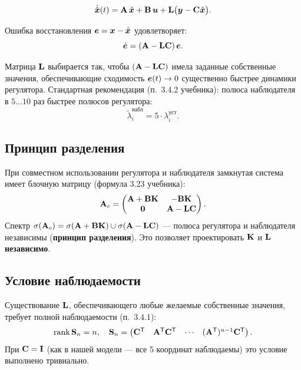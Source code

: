 \begin{formulabox}[title={Уравнение наблюдателя (Luenberger)}]
\begin{equation}
  \dot{\hat{\bm{x}}}(t) = \mathbf{A}\,\hat{\bm{x}} + \mathbf{B}\,\bm{u}
       + \mathbf{L}\big(\bm{y} - \mathbf{C}\hat{\bm{x}}\big).
  \label{eq:observer}
\end{equation}
\end{formulabox}

Ошибка восстановления $\bm{e} = \bm{x} - \hat{\bm{x}}$ удовлетворяет:
\begin{equation}
  \dot{\bm{e}} = (\mathbf{A} - \mathbf{L}\mathbf{C})\,\bm{e}.
  \label{eq:observer_error}
\end{equation}

Матрица $\mathbf{L}$ выбирается так, чтобы $(\mathbf{A}-\mathbf{L}\mathbf{C})$
имела заданные собственные значения, обеспечивающие сходимость
$\bm{e}(t) \to 0$ существенно быстрее динамики регулятора.
Стандартная рекомендация (п.~3.4.2 учебника): полюса наблюдателя в $5\ldots10$ раз
быстрее полюсов регулятора:
\begin{equation}
  \tilde{\lambda}^{\text{набл}}_i = 5 \cdot \lambda^{\text{уст}}_i.
  \label{eq:observer_eigvals}
\end{equation}

\subsection{Принцип разделения}

При совместном использовании регулятора и наблюдателя замкнутая
система имеет блочную матрицу (формула 3.23 учебника):
\begin{equation}
  \mathbf{A}_c = \begin{pmatrix}
    \mathbf{A}+\mathbf{B}\mathbf{K} & -\mathbf{B}\mathbf{K}\\
    \mathbf{0} & \mathbf{A}-\mathbf{L}\mathbf{C}
  \end{pmatrix}.
  \label{eq:separation}
\end{equation}
Спектр $\sigma(\mathbf{A}_c) = \sigma(\mathbf{A}+\mathbf{B}\mathbf{K}) \cup \sigma(\mathbf{A}-\mathbf{L}\mathbf{C})$ ---
полюса регулятора и наблюдателя независимы (\textbf{принцип разделения}).
Это позволяет проектировать $\mathbf{K}$ и $\mathbf{L}$ \textbf{независимо}.

\subsection{Условие наблюдаемости}

Существование $\mathbf{L}$, обеспечивающего любые желаемые собственные
значения, требует полной наблюдаемости (п.~3.4.1):
\begin{equation}
  \operatorname{rank}\mathbf{S}_n = n,
  \quad
  \mathbf{S}_n = \begin{pmatrix} \mathbf{C}^{\mathsf{T}} & \mathbf{A}^{\mathsf{T}}\mathbf{C}^{\mathsf{T}} & \cdots & (\mathbf{A}^{\mathsf{T}})^{n-1}\mathbf{C}^{\mathsf{T}} \end{pmatrix}.
  \label{eq:observability}
\end{equation}
При $\mathbf{C} = \mathbf{I}$ (как в нашей модели --- все 5 координат
наблюдаемы) это условие выполнено тривиально.

